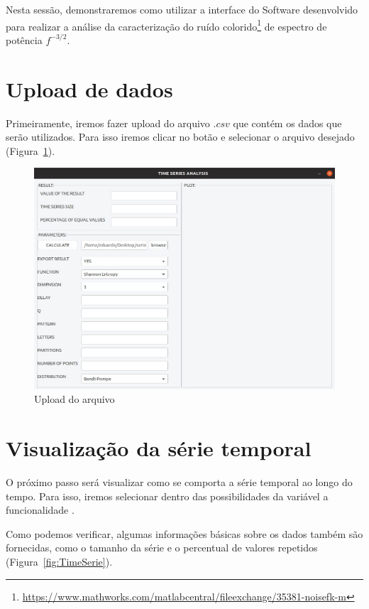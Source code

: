 
Nesta sessão, demonstraremos como utilizar a interface do Software desenvolvido para realizar a análise da caracterização do ruído colorido\footnote{\url{https://www.mathworks.com/matlabcentral/fileexchange/35381-noisefk-m}} de espectro de potência $f^{-3/2}$.

\section{Upload de dados} 

Primeiramente, iremos fazer upload do arquivo $.csv$ que contém os dados que serão utilizados. Para isso iremos clicar no botão  e selecionar o arquivo desejado (Figura~\ref{fig:Upload}).

\begin{figure}[H]
	\centering
	\includegraphics[width=0.85\columnwidth]{capitulos/imagens/Upload} 
    \caption{Upload do arquivo}
    \label{fig:Upload}
\end{figure}

\section{Visualização da série temporal}

O próximo passo será visualizar como se comporta a série temporal ao longo do tempo. Para isso, iremos selecionar dentro das possibilidades da variável  a funcionalidade .

Como podemos verificar, algumas informações básicas sobre os dados também são fornecidas, como o tamanho da série e o percentual de valores repetidos (Figura~\ref{fig:TimeSerie}).

